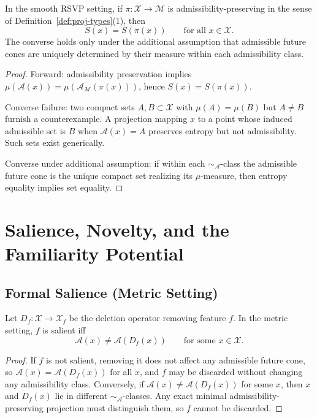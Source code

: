 \documentclass[12pt, a4paper, oneside]{book}
\newcommand{\Adm}{\mathcal{A}}
\newcommand{\X}{\mathcal{X}}
\newcommand{\M}{\mathcal{M}}
\newcommand{\proj}{\pi}
\newcommand{\SA}{{\sim_{\!\Adm}}}
\newcommand{\Ent}{S}
\begin{document}
\begin{proposition}
\label{prop:entropy-necessary}
In the smooth RSVP setting, if $\proj : \X \to \M$ is admissibility-pre\-ser\-ving
in the sense of Definition~\ref{def:proj-types}(1), then
\[
  \Ent(x) = \Ent(\proj(x)) \qquad \text{for all } x \in \X.
\]
The converse holds only under the additional assumption that admissible
future cones are uniquely determined by their measure within each
admissibility class.
\end{proposition}

\begin{proof}
Forward: admissibility preservation implies $\mu(\Adm(x)) =
\mu(\Adm_\M(\proj(x)))$, hence $\Ent(x) = \Ent(\proj(x))$.

Converse failure: two compact sets $A, B \subset \X$ with $\mu(A) = \mu(B)$
but $A \neq B$ furnish a counterexample. A projection mapping $x$ to a
point whose induced admissible set is $B$ when $\Adm(x) = A$ preserves
entropy but not admissibility. Such sets exist generically.

Converse under additional assumption: if within each $\SA$-class the
admissible future cone is the unique compact set realizing its
$\mu$-measure, then entropy equality implies set equality.
\end{proof}

\chapter{Salience, Novelty, and the Familiarity Potential}
\label{ch:salience}

\section{Formal Salience (Metric Setting)}

\begin{theorem}
\label{thm:salience}
Let $D_f : \X \to \X_f$ be the deletion operator removing feature $f$.
In the metric setting, $f$ is salient iff
\[
  \Adm(x) \neq \Adm(D_f(x)) \qquad \text{for some } x \in \X.
\]
\end{theorem}

\begin{proof}
If $f$ is not salient, removing it does not affect any admissible future
cone, so $\Adm(x) = \Adm(D_f(x))$ for all $x$, and $f$ may be discarded
without changing any admissibility class. Conversely, if $\Adm(x) \neq
\Adm(D_f(x))$ for some $x$, then $x$ and $D_f(x)$ lie in different
$\SA$-classes. Any exact minimal admissibility-preserving projection must
distinguish them, so $f$ cannot be discarded.
\end{proof}
\end{document}
